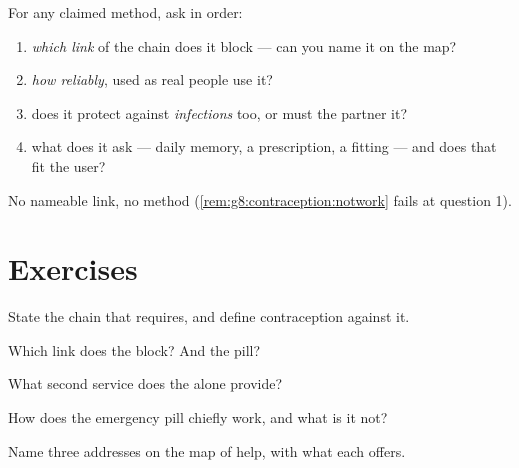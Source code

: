 \begin{method}\label{met:g8:contraception:evaluate}
For any claimed method, ask in order:
\begin{enumerate}
  \item \emph{which link} of the chain does it block ---
        can you name it on the map?
  \item \emph{how reliably}, used as real people use it?
  \item does it protect against \emph{infections} too, or
        must the  partner it?
  \item what does it ask --- daily memory, a
        prescription, a fitting --- and does that fit the
        user?
\end{enumerate}
No nameable link, no method
(\cref{rem:g8:contraception:notwork} fails at question
1).
\end{method}

\section{Exercises}

\begin{exercise}[$\star$]\label{exo:g8:contraception:1}
State the chain that  requires, and define
contraception against it.
\end{exercise}

\begin{exercise}[$\star$]\label{exo:g8:contraception:2}
Which link does the  block? And the pill?
\end{exercise}

\begin{exercise}[$\star$]\label{exo:g8:contraception:3}
What second service does the  alone provide?
\end{exercise}

\begin{exercise}[$\star$]\label{exo:g8:contraception:4}
How does the emergency pill chiefly work, and what is it
not?
\end{exercise}

\begin{exercise}[$\star$]\label{exo:g8:contraception:5}
Name three addresses on the map of help, with what each
offers.
\end{exercise}

